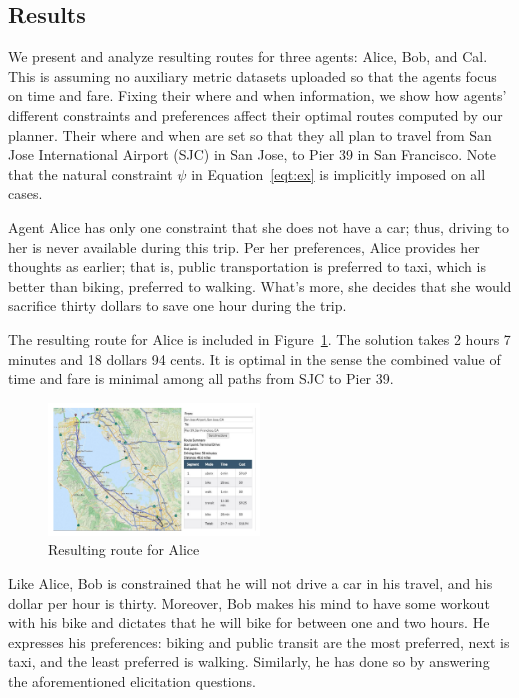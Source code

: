 \documentclass[letterpaper]{article}
\newcommand{\figref}[1]{Figure~\ref{fig:#1}}
\newcommand{\eqtref}[1]{Equation~\ref{eqt:#1}}
\begin{document}
\subsection{Results}
We present and analyze resulting routes for three agents:
Alice, Bob, and Cal.
This is assuming no auxiliary metric datasets uploaded
so that the agents focus on time and fare.
Fixing their where and when information, we show how
agents' different constraints and preferences affect
their optimal routes computed by our planner.
Their where and when are set so that they all plan to
travel from San Jose International Airport (SJC) in
San Jose, to Pier 39 in San Francisco.
Note that the natural constraint $\psi$ in \eqtref{ex} 
is implicitly imposed on all cases.

Agent Alice has only one constraint that she does not 
have a car; thus, driving to her is never available during this trip.
Per her preferences, Alice provides her thoughts as earlier;
that is, public transportation is preferred to taxi, which is
better than biking, preferred to walking.
What's more, she decides that she would sacrifice thirty dollars
to save one hour during the trip.

The resulting route for Alice is included in \figref{alice}.
The solution takes 2 hours 7 minutes and 18 dollars 94 cents.
It is optimal in the sense the combined value of time
and fare is minimal among all paths from SJC to Pier 39.

\begin{figure}[!ht]
  \centering
    \includegraphics[width=0.5\textwidth]{figs/result_Alice.pdf}
  \caption{Resulting route for Alice\label{fig:alice}}
\end{figure}

Like Alice, Bob is constrained that he will not drive a car in his travel,
and his dollar per hour is thirty.
Moreover, Bob makes his mind to have some workout with his bike and
dictates that he will bike for between one and two hours.
He expresses his preferences: biking and public transit are the most
preferred, next is taxi, and the least preferred is walking.
Similarly, he has done so by answering the aforementioned elicitation questions.
\end{document}
